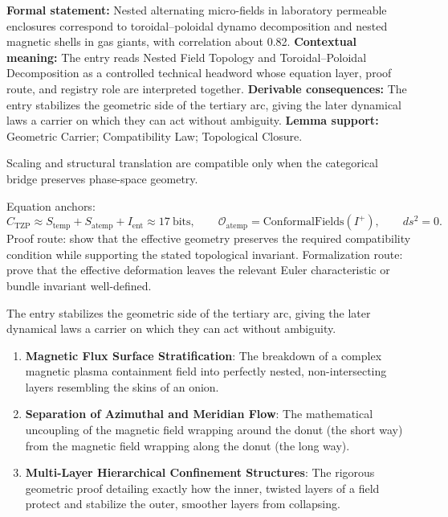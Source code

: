 \begingroup\footnotesize\setlength{\emergencystretch}{3em}\sloppy
\textbf{Formal statement:} Nested alternating micro-fields in laboratory permeable enclosures correspond to toroidal--poloidal dynamo decomposition and nested magnetic shells in gas giants, with correlation about 0.82. \textbf{Contextual meaning:} The entry reads Nested Field Topology and Toroidal--Poloidal Decomposition as a controlled technical headword whose equation layer, proof route, and registry role are interpreted together. \textbf{Derivable consequences:} The entry stabilizes the geometric side of the tertiary arc, giving the later dynamical laws a carrier on which they can act without ambiguity. \textbf{Lemma support:} Geometric Carrier; Compatibility Law; Topological Closure.\par
\endgroup

Scaling and structural translation are compatible only when the categorical bridge preserves phase-space geometry.

Equation anchors:
\[
C_{\mathrm{TZP}}\approx S_{\mathrm{temp}}+S_{\mathrm{atemp}}+I_{\mathrm{ent}}\approx17\ \mathrm{bits},
\qquad
\mathcal{O}_{\mathrm{atemp}}=\mathrm{ConformalFields}(I^+),
\qquad
ds^2=0.
\]
Proof route: show that the effective geometry preserves the required compatibility condition while supporting the stated topological invariant. Formalization route: prove that the effective deformation leaves the relevant Euler characteristic or bundle invariant well-defined.

The entry stabilizes the geometric side of the tertiary arc, giving the later dynamical laws a carrier on which they can act without ambiguity.
\endgroup

\begin{enumerate}[leftmargin=1.6em,itemsep=6pt,topsep=4pt]
\item \textbf{Magnetic Flux Surface Stratification}: The breakdown of a complex magnetic plasma containment field into perfectly nested, non-intersecting layers resembling the skins of an onion.
\item \textbf{Separation of Azimuthal and Meridian Flow}: The mathematical uncoupling of the magnetic field wrapping around the donut (the short way) from the magnetic field wrapping along the donut (the long way).
\item \textbf{Multi-Layer Hierarchical Confinement Structures}: The rigorous geometric proof detailing exactly how the inner, twisted layers of a field protect and stabilize the outer, smoother layers from collapsing.
\end{enumerate}


